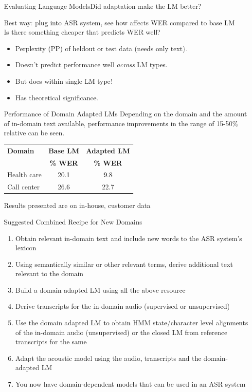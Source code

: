 \begin{frame}{Evaluating Language Models}{Did adaptation make the LM better?}

Best way: plug into ASR system, see how affects WER compared to base LM \\

Is there something cheaper that predicts WER well?
\begin{itemize}
\item {\color{red} {Perplexity} (PP) } of heldout or test data (needs only text).
\item Doesn't predict performance well \emph{across} LM types.
\item But does within single LM type!
\item Has theoretical significance.
\end{itemize}


\end{frame}


\begin{frame}{Performance of Domain Adapted LMs}{}
  Depending on the domain and the amount of in-domain text available, performance improvements in the range of 15-50\% relative can be seen.
  \vfill
  \centering
  \begin{tabular}{@{}lc@{}c@{}} \toprule
    {\bf Domain } &  {\bf Base LM } & {\bf Adapted LM } \\ 
    {\bf   } &  {\bf   \% WER} & {\bf \% WER } \\ \midrule
    Health care & 20.1 & 9.8 \\
    Call center&  26.6 & 22.7 \\ \bottomrule
  \end{tabular}
  \vfill
  \raggedright
  Results  presented are on in-house, customer data
\end{frame}


\begin{frame} {Suggested Combined Recipe for New Domains}
\begin{enumerate}
\item Obtain relevant in-domain text and include new words to the ASR system's lexicon
\item Using semantically similar or other relevant terms, derive additional text relevant to the domain
\item Build a domain adapted LM using all the above resource
\item Derive transcripts for the in-domain audio (supervised or unsupervised)
\item Use the domain adapted LM to obtain HMM state/character level alignments  of the in-domain audio (unsupervised) or the closed LM from reference transcripts for the same
\item Adapt the acoustic model using the audio, transcripts and the domain-adapted LM
\item You now have domain-dependent models that can be used in an ASR system
\end{enumerate}
\end{frame}


